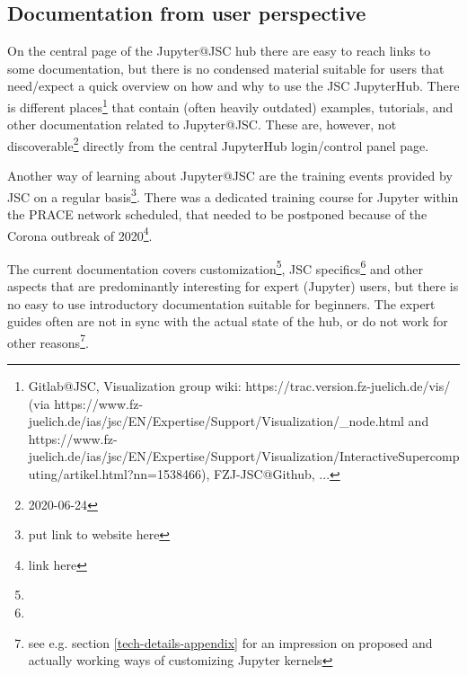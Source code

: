 
\subsection{Documentation from user perspective}
\label{s-doc-from-user-pov}

On the central page of the Jupyter@JSC hub there are easy to reach links to some documentation, but there is no condensed material suitable for users that need/expect a quick overview on how and why to use the JSC JupyterHub.
There is different places\footnote{Gitlab@JSC, Visualization group wiki: https://trac.version.fz-juelich.de/vis/ (via https://www.fz-juelich.de/ias/jsc/EN/Expertise/Support/Visualization/_node.html and https://www.fz-juelich.de/ias/jsc/EN/Expertise/Support/Visualization/InteractiveSupercomputing/artikel.html?nn=1538466), FZJ-JSC@Github, ...} that contain (often heavily outdated) examples, tutorials, and other documentation related to Jupyter@JSC.
These are, however, not discoverable\footnote{2020-06-24} directly from the central JupyterHub login/control panel page.

Another way of learning about Jupyter@JSC are the training events provided by JSC on a regular basis\footnote{put link to website here}.
There was a dedicated training course for Jupyter within the PRACE network scheduled, that needed to be postponed because of the Corona outbreak of 2020\footnote{link here}.

The current documentation covers customization\footnote{}, JSC specifics\footnote{} and other aspects that are predominantly interesting for expert (Jupyter) users, but there is no easy to use introductory documentation suitable for beginners.
The expert guides often are not in sync with the actual state of the hub, or do not work for other reasons\footnote{see e.g. section \ref{tech-details-appendix} for an impression on proposed and actually working ways of customizing Jupyter kernels}.

